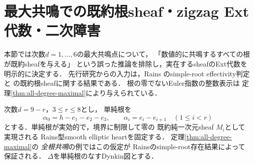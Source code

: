 \section{最大共鳴での既約根sheaf・zigzag Ext代数・二次障害}
\label{sec:resonance-zigzag}
本節では次数$d=1,\ldots,6$の最大共鳴点について，
「数値的に共鳴するすべての根が既約sheafを与える」
という誤った推論を排除し，実在するsheafのExt代数を
明示的に決定する．
先行研究からの入力は，Rains
\cite[\S4, pp.~33--34]{RainsFiltered}のsimple-root
effectivity判定と
\cite[Definition 9.1, Proposition 7.19, \S11]{RainsBirational}
の既約根sheafに関する結果である．
根の零でないEuler指数の整数表示は
定理\ref{thm:all-degree-maximal}により与えられている．

次数$d=9-r$，$3\le r\le8$とし，
単純根を
\[
\alpha_0=h-e_1-e_2-e_3,\qquad
\alpha_i=e_i-e_{i+1}\quad(1\le i<r)
\]
とする．単純根が実効的で，境界に制限して零の
既約純一次元sheaf $M_i$として実現される
Rains型smooth elliptic heartを固定する．
定理\ref{thm:all-degree-maximal}の
\emph{全根共鳴}の例ではこの仮定が
Rainsのsimple-root存在結果によって保証される．
$\Delta$を単純根のなすDynkin図とする．

